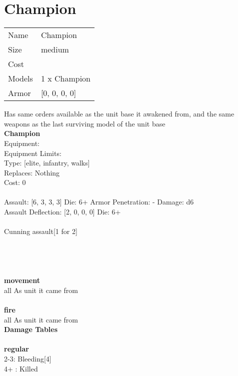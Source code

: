 \section{ Champion }

\begin{tabular}{ll}
  Name & Champion \\
  Size & medium\\
  Cost & \\
  Models & 1 x Champion\\
  Armor & [0, 0, 0, 0]\\
\end{tabular}

\noindent Has same orders available as the unit base it awakened from, and the same weapons as the last surviving model of the unit base\\ 


{\bf Champion } \\
Equipment:  \\
Equipment Limits:  \\
Type: [elite, infantry, walks] \\
Replaces: Nothing \\
Cost: 0\\
\ \\
Assault: [6, 3, 3, 3] Die: 6+ Armor Penetration: - Damage: d6 \\
Assault Deflection: [2, 0, 0, 0] Die: 6+\\
\\ 
Cunning assault[1 for 2]\\ 
 
\ \\

\ \\
 
\ \\



\ \\ {\bf movement } \\
all As unit it came from \\
\ \\ {\bf fire } \\
all As unit it came from \\


{\bf Damage Tables} \\
\ \\ {\bf regular } \\
2-3: Bleeding[4] \\
4+ : Killed \\










